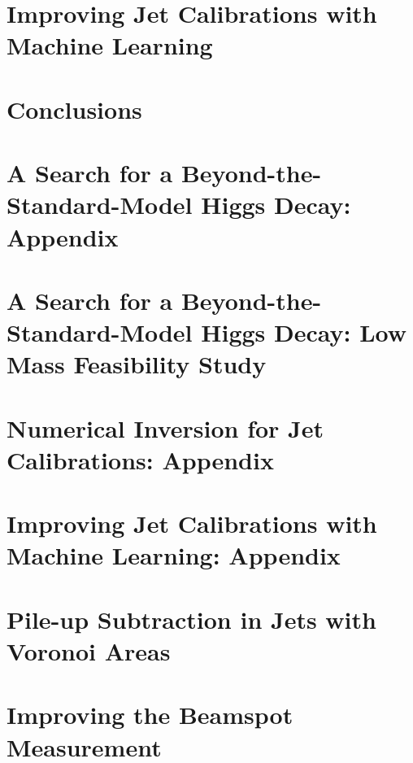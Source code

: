 \documentclass[12pt]{report}
\begin{document}
\chapter{Improving Jet Calibrations with Machine Learning}
\label{ch:GenNI}

\chapter{Conclusions}
\label{ch:Conclusion}

\appendix

\chapter{A Search for a Beyond-the-Standard-Model Higgs Decay: Appendix}
\label{ch:HBSM_app}
\chapter{A Search for a Beyond-the-Standard-Model Higgs Decay: Low Mass Feasibility Study}
\label{ch:HBSM_lowmass_app}
\chapter{Numerical Inversion for Jet Calibrations: Appendix}
\label{ch:NI_app}
\chapter{Improving Jet Calibrations with Machine Learning: Appendix}
\label{ch:GenNI_app}
\chapter{Pile-up Subtraction in Jets with Voronoi Areas}
\label{ch:Voronoi}
\chapter{Improving the Beamspot Measurement}
\label{ch:Beamspot}

 
  
{}
\end{document}

